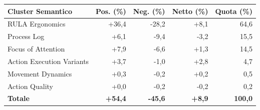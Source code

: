 \begin{tabular*}{\linewidth}{@{}l@{\extracolsep{\fill}}rrrr@{}}
\toprule
\textbf{Cluster Semantico} & \textbf{Pos. (\%)} & \textbf{Neg. (\%)} & \textbf{Netto (\%)} & \textbf{Quota (\%)} \\
\midrule
RULA Ergonomics & +36{,}4 & -28{,}2 & +8{,}1 & 64{,}6 \\
Process Log & +6{,}1 & -9{,}4 & -3{,}2 & 15{,}5 \\
Focus of Attention & +7{,}9 & -6{,}6 & +1{,}3 & 14{,}5 \\
Action Execution Variants & +3{,}7 & -1{,}0 & +2{,}8 & 4{,}7 \\
Movement Dynamics & +0{,}3 & -0{,}2 & +0{,}2 & 0{,}5 \\
Action Quality & +0{,}0 & -0{,}2 & -0{,}2 & 0{,}2 \\
\midrule
\textbf{Totale} & \textbf{+54{,}4} & \textbf{-45{,}6} & \textbf{+8{,}9} & \textbf{100{,}0} \\
\bottomrule
\end{tabular*}
